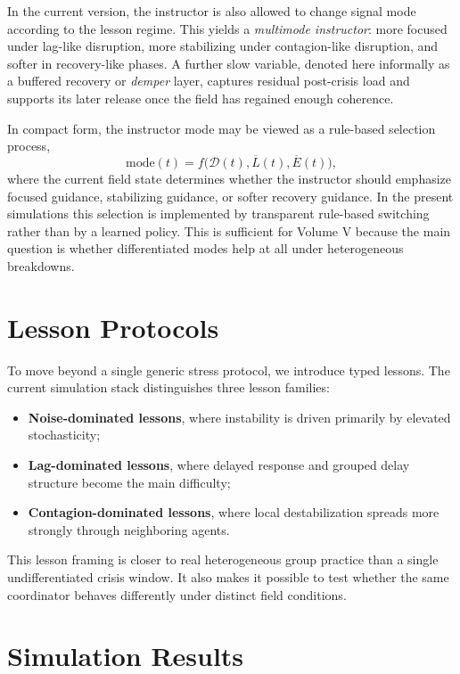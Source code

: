 \documentclass[12pt,a4paper]{article}
\begin{document}
In the current version, the instructor is also allowed to change signal mode according to the lesson regime. This yields a \emph{multimode instructor}: more focused under lag-like disruption, more stabilizing under contagion-like disruption, and softer in recovery-like phases. A further slow variable, denoted here informally as a buffered recovery or \emph{demper} layer, captures residual post-crisis load and supports its later release once the field has regained enough coherence.

In compact form, the instructor mode may be viewed as a rule-based selection process,
\begin{equation}
\mathrm{mode}(t)=f\big(\mathcal{D}(t),\overline{L}(t),\overline{E}(t)\big),
\end{equation}
where the current field state determines whether the instructor should emphasize focused guidance, stabilizing guidance, or softer recovery guidance. In the present simulations this selection is implemented by transparent rule-based switching rather than by a learned policy. This is sufficient for Volume V because the main question is whether differentiated modes help at all under heterogeneous breakdowns.

\section{Lesson Protocols}
To move beyond a single generic stress protocol, we introduce typed lessons. The current simulation stack distinguishes three lesson families:
\begin{itemize}
    \item \textbf{Noise-dominated lessons}, where instability is driven primarily by elevated stochasticity;
    \item \textbf{Lag-dominated lessons}, where delayed response and grouped delay structure become the main difficulty;
    \item \textbf{Contagion-dominated lessons}, where local destabilization spreads more strongly through neighboring agents.
\end{itemize}

This lesson framing is closer to real heterogeneous group practice than a single undifferentiated crisis window. It also makes it possible to test whether the same coordinator behaves differently under distinct field conditions.

\section{Simulation Results}
\end{document}

